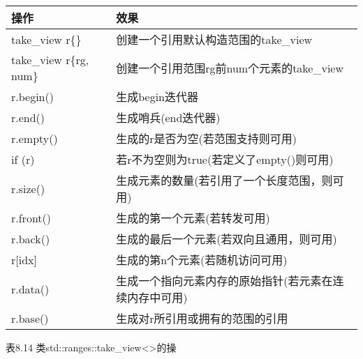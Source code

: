 \begin{longtable}[c]{|l|l|}
\hline
\textbf{操作} & \textbf{效果}                                                        \\ \hline
\endfirsthead
%
\endhead
%
take\_view r\{\}   & 创建一个引用默认构造范围的take\_view        \\ \hline
take\_view r\{rg, num\} & 创建一个引用范围rg前num个元素的take\_view                             \\ \hline
r.begin()          & 生成begin迭代器                                              \\ \hline
r.end()            & 生成哨兵(end迭代器)                                     \\ \hline
r.empty()          & 生成的r是否为空(若范围支持则可用)          \\ \hline
if (r)             & 若r不为空则为true(若定义了empty()则可用)                \\ \hline
r.size()           & 生成元素的数量(若引用了一个长度范围，则可用) \\ \hline
r.front()          & 生成的第一个元素(若转发可用)                      \\ \hline
r.back()           & 生成的最后一个元素(若双向且通用，则可用)         \\ \hline
r{[}idx{]}         & 生成的第n个元素(若随机访问可用)                    \\ \hline
r.data()           & 生成一个指向元素内存的原始指针(若元素在连续内存中可用) \\ \hline
r.base()           & 生成对r所引用或拥有的范围的引用               \\ \hline
\end{longtable}

\begin{center}
表8.14 类std::ranges::take\_view<>的操
\end{center}


